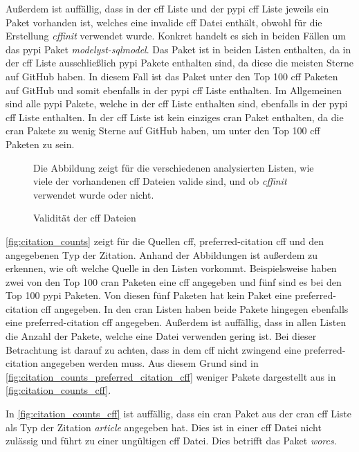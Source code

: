 Außerdem ist auffällig, dass in der \gls{cff} Liste und der \gls{pypi} \gls{cff} Liste jeweils ein Paket vorhanden ist, welches eine invalide \gls{cff} Datei enthält, obwohl für die Erstellung \emph{cffinit} verwendet wurde.
Konkret handelt es sich in beiden Fällen um das \gls{pypi} Paket \emph{modelyst-sqlmodel}.
Das Paket ist in beiden Listen enthalten, da in der \gls{cff} Liste ausschließlich \gls{pypi} Pakete enthalten sind, da diese die meisten Sterne auf GitHub haben.
In diesem Fall ist das Paket unter den Top 100 \gls{cff} Paketen auf GitHub und somit ebenfalls in der \gls{pypi} \gls{cff} Liste enthalten.
Im Allgemeinen sind alle \gls{pypi} Pakete, welche in der \gls{cff} Liste enthalten sind, ebenfalls in der \gls{pypi} \gls{cff} Liste enthalten.
In der \gls{cff} Liste ist kein einziges \gls{cran} Paket enthalten, da die \gls{cran} Pakete zu wenig Sterne auf GitHub haben, um unter den Top 100 \gls{cff} Paketen zu sein.

\begin{figure}
    \centering
    
    \caption{Validität der \gls{cff} Dateien}
    \label{fig:overall_valid_cff}
    \small
    \raggedright
    Die Abbildung zeigt für die verschiedenen analysierten Listen, wie viele der vorhandenen \gls{cff} Dateien valide sind, und ob \emph{cffinit} verwendet wurde oder nicht.
\end{figure}

\autoref{fig:citation_counts} zeigt für die Quellen \gls{cff}, \glqq preferred-citation\grqq{} \gls{cff} und  den angegebenen Typ der Zitation.
Anhand der Abbildungen ist außerdem zu erkennen, wie oft welche Quelle in den Listen vorkommt.
Beispielsweise haben zwei von den Top 100 \gls{cran} Paketen eine \gls{cff} angegeben und fünf sind es bei den Top 100 \gls{pypi} Paketen.
Von diesen fünf Paketen hat kein Paket eine \glqq preferred-citation\grqq{} \gls{cff} angegeben.
In den \gls{cran} Listen haben beide Pakete hingegen ebenfalls eine \glqq preferred-citation\grqq{} \gls{cff} angegeben.
Außerdem ist auffällig, dass in allen Listen die Anzahl der Pakete, welche eine  Datei verwenden gering ist.
Bei dieser Betrachtung ist darauf zu achten, dass in dem \gls{cff} nicht zwingend eine \glqq preferred-citation\grqq{} angegeben werden muss.
Aus diesem Grund sind in \autoref{fig:citation_counts_preferred_citation_cff} weniger Pakete dargestellt aus in \autoref{fig:citation_counts_cff}.

In \autoref{fig:citation_counts_cff} ist auffällig, dass ein \gls{cran} Paket aus der \gls{cran} \gls{cff} Liste als Typ der Zitation \emph{article} angegeben hat.
Dies ist in einer \gls{cff} Datei nicht zulässig und führt zu einer ungültigen \gls{cff} Datei.
Dies betrifft das Paket \emph{worcs}.

